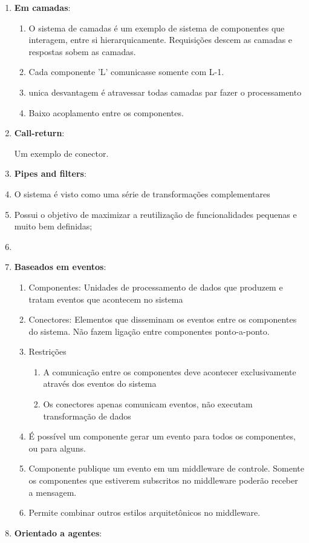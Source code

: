 \documentclass[12pt]{article}
\begin{document}
\begin{enumerate}
\item \textbf{Em camadas}:
\begin{enumerate}

\item O sistema de camadas é um exemplo de sistema de componentes que interagem, entre si hierarquicamente. Requisições descem as camadas e respostas sobem as camadas.

\item Cada componente 'L' comunicasse somente com L-1.

\item unica desvantagem é atravessar todas camadas par fazer o processamento
\item Baixo acoplamento entre os componentes.
\end{enumerate}
\item \textbf{Call-return}:

	Um exemplo de conector. 
\item \textbf{Pipes and filters}:

	\item O sistema é visto como uma série de transformações complementares
	\item Possui o objetivo de maximizar a reutilização de funcionalidades pequenas e muito bem definidas;
	\item 
\item \textbf{Baseados em eventos}:
	\begin{enumerate}
		\item Componentes: Unidades de processamento de dados que produzem e tratam eventos que acontecem no sistema
		\item Conectores: Elementos que disseminam os eventos entre os componentes do sistema.
		 Não fazem ligação entre componentes ponto-a-ponto.
		 
		\item Restrições
		 \begin{enumerate}
	
		\item A comunicação entre os componentes deve acontecer exclusivamente através dos eventos do sistema
		\item Os conectores apenas comunicam eventos, não executam transformação de dados
			\end{enumerate}
		\item É possível um componente gerar um evento para todos os componentes, ou para alguns. 
		\item Componente publique um evento em um middleware de controle. Somente os componentes que estiverem subscritos no middleware poderão receber a mensagem.
		\item Permite combinar outros estilos arquitetônicos no middleware.
	\end{enumerate}
\item \textbf{ Orientado a agentes}:
	

\end{enumerate}
\end{document}
